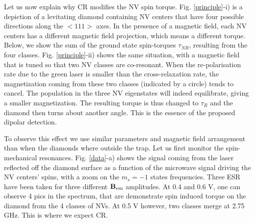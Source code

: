 \documentclass[preprintnumbers,amsmath,amssymb,superscriptaddress,twocolumn,showpacs]{revtex4-1}
\begin{document}
\begin{figure*}[!ht]
  \centering {}
  \caption{a) Angular detection of the diamond as a function of microwave frequency for three different magnetic field values. 
b) PL detection as a function of Bem across a co-resonance. trace i) exp, trace ii) theory. 
c) Angular detection... 
  }
  \label{data}
\end{figure*}

Let us now explain why CR modifies the NV spin torque.
Fig. \ref{principle}-i) is a depiction of a levitating diamond containing NV centers that have four possible directions along the $<111>$ axes. 
In the presence of a magnetic field, each NV centers has a different magnetic field projection, which means a different torque. 
Below, we show the sum of the ground state spin-torques $\tau_{NR}$, resulting from the four classes. 
Fig. \ref{principle}-ii) shows the same situation, with a magnetic field that is tuned so that two NV classes are co-resonant. 
When the re-polarisation rate due to the green laser is smaller than the cross-relaxation rate, the magnetization coming from these two classes (indicated by a circle) tends to cancel. The population in the three NV eigenstates will indeed equilibrate, giving a smaller magnetization.
The resulting torque is thus changed to $\tau_{R}$ and the diamond then turns about another angle.
This is the essence of the proposed dipolar detection. 


To observe this effect we use similar parameters and magnetic field arrangement than when the diamonds where outside the trap.
Let us first monitor the spin-mechanical resonances. 
Fig. \ref{data}-a) shows the signal coming from the laser reflected off the diamond surface as a function of the microwave signal driving the NV centers' spins, with a zoom on the $m_s=-1$ states frequencies.
Three ESR have been taken for three different $\bf B_{\rm em}$ amplitudes. 
At 0.4 and 0.6 V, one can observe 4 pics in the spectrum, that are demonstrate spin induced torque on the diamond from the 4 classes of NVs.
At 0.5 V however, two classes merge at 2.75 GHz. This is where we expect CR.
\end{document}
